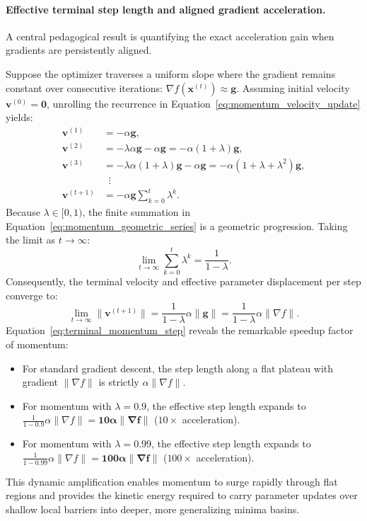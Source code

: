 \paragraph{Effective terminal step length and aligned gradient acceleration.}
A central pedagogical result is quantifying the exact acceleration gain when gradients are persistently aligned.

Suppose the optimizer traverses a uniform slope where the gradient remains constant over consecutive iterations: $\nabla f(\mathbf{x}^{(t)}) \approx \mathbf{g}$. Assuming initial velocity $\mathbf{v}^{(0)} = \mathbf{0}$, unrolling the recurrence in Equation~\eqref{eq:momentum_velocity_update} yields:
\begin{align}
\mathbf{v}^{(1)} &= -\alpha \mathbf{g}, \nonumber \\
\mathbf{v}^{(2)} &= -\lambda \alpha \mathbf{g} - \alpha \mathbf{g} = -\alpha (1 + \lambda) \mathbf{g}, \nonumber \\
\mathbf{v}^{(3)} &= -\lambda \alpha (1 + \lambda) \mathbf{g} - \alpha \mathbf{g} = -\alpha (1 + \lambda + \lambda^2) \mathbf{g}, \nonumber \\
&\;\;\vdots \nonumber \\
\mathbf{v}^{(t+1)} &= -\alpha \mathbf{g} \sum_{k=0}^t \lambda^k.
\label{eq:momentum_geometric_series}
\end{align}
Because $\lambda \in [0, 1)$, the finite summation in Equation~\eqref{eq:momentum_geometric_series} is a geometric progression. Taking the limit as $t \to \infty$:
\begin{equation}
\lim_{t \to \infty} \sum_{k=0}^t \lambda^k = \frac{1}{1 - \lambda}.
\end{equation}
Consequently, the terminal velocity and effective parameter displacement per step converge to:
\begin{equation}
\lim_{t \to \infty} \|\mathbf{v}^{(t+1)}\| = \frac{1}{1 - \lambda} \alpha \|\mathbf{g}\| = \frac{1}{1 - \lambda} \alpha \|\nabla f\|.
\label{eq:terminal_momentum_step}
\end{equation}
Equation~\eqref{eq:terminal_momentum_step} reveals the remarkable speedup factor of momentum:
\begin{itemize}[noitemsep]
  \item For standard gradient descent, the step length along a flat plateau with gradient $\|\nabla f\|$ is strictly $\alpha \|\nabla f\|$.
  \item For momentum with $\lambda = 0.9$, the effective step length expands to $\frac{1}{1 - 0.9}\alpha \|\nabla f\| = \mathbf{10 \alpha \|\nabla f\|}$ ($10\times$ acceleration).
  \item For momentum with $\lambda = 0.99$, the effective step length expands to $\frac{1}{1 - 0.99}\alpha \|\nabla f\| = \mathbf{100 \alpha \|\nabla f\|}$ ($100\times$ acceleration).
\end{itemize}
This dynamic amplification enables momentum to surge rapidly through flat regions and provides the kinetic energy required to carry parameter updates over shallow local barriers into deeper, more generalizing minima basins.

